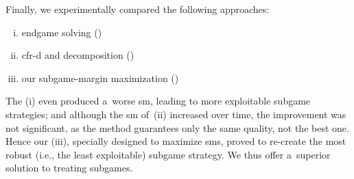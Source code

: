 Finally, we experimentally compared the following approaches:
\begin{enumerate}[(i)]
  \item endgame solving (\cite{Ganzfried2015endgame})
  \item \acrshort{cfr-d} and decomposition (\cite{BurchJohansonBowling2014})
  \item our subgame-margin maximization (\cite{Moravcik2016refining})
\end{enumerate}
The (i) even produced a~worse \acrshort{sm}, leading to more exploitable subgame strategies;
and although the \acrshort{sm} of~(ii) increased over time, the improvement was not significant, as the method guarantees only the same quality, not the best one.
Hence our (iii), specially designed to maximize \acrshort{sm}s, proved to re-create the most robust (i.e., the least exploitable) subgame strategy.
We thus offer a~superior solution to treating subgames.
